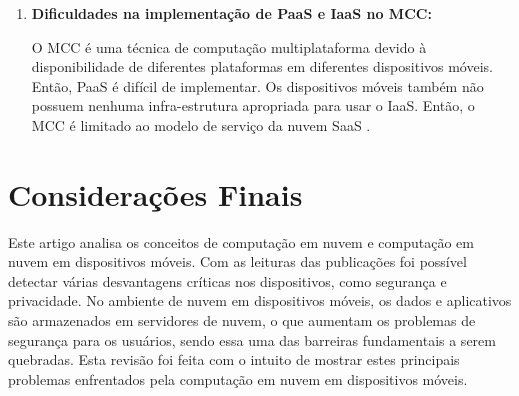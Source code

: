 \documentclass[12pt]{article}
\begin{document}
\begin{enumerate}
  \item \textbf{Dificuldades na implementação de PaaS e IaaS no MCC:}
  
  O MCC é uma técnica de computação multiplataforma devido à disponibilidade de diferentes plataformas em diferentes 
  dispositivos móveis. Então, PaaS é difícil de implementar. Os dispositivos móveis também não possuem nenhuma 
  infra-estrutura apropriada para usar o IaaS. Então, o MCC é limitado ao modelo de serviço da nuvem SaaS \cite{kumar2014}.
  

  
\end{enumerate}


\section{Considerações Finais}

Este artigo analisa os conceitos de computação em nuvem e computação em nuvem em dispositivos móveis. Com as leituras das
publicações foi possível detectar várias desvantagens críticas nos dispositivos, como segurança e privacidade. No ambiente de
nuvem em dispositivos móveis, os dados e aplicativos são armazenados em servidores de nuvem, o que aumentam os problemas de
segurança para os usuários, sendo essa uma das barreiras fundamentais a serem quebradas. Esta revisão foi feita com o intuito de
mostrar estes principais problemas enfrentados pela computação em nuvem em dispositivos móveis.



\end{document}

